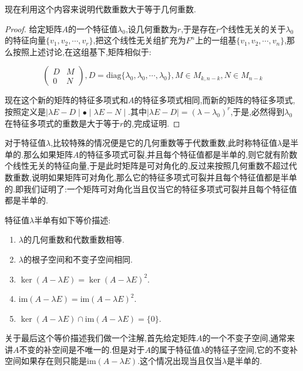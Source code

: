 现在利用这个内容来说明代数重数大于等于几何重数.
\begin{proof}

给定矩阵$A$的一个特征值$\lambda_0$,设几何重数为$r$,于是存在$r$个线性无关的关于$\lambda_0$的特征向量$\{v_1,v_2,\cdots,v_r\}$,把这个线性无关组扩充为$F^n$上的一组基$\{v_1,v_2,\cdots,v_n\}$,那么按照上述讨论,在这组基下,矩阵相似于:

$$\left(\begin{array}{cc}
D&M\\
0&N
\end{array}\right),D=\mathrm{diag}\{\lambda_0,\lambda_0,\cdots,\lambda_0\},M\in M_{k,n-k},N\in M_{n-k}$$

现在这个新的矩阵的特征多项式和$A$的特征多项式相同,而新的矩阵的特征多项式,按照定义是$\mid\lambda E-D\mid\bullet\mid\lambda E-N\mid$.其中$\mid\lambda E-D\mid=(\lambda-\lambda_0)^r$,于是,必然得到$\lambda_0$在特征多项式的重数是大于等于$r$的,完成证明.
\end{proof}

对于特征值$\lambda$,比较特殊的情况便是它的几何重数等于代数重数,此时称特征值$\lambda$是半单的.那么如果矩阵$A$的特征多项式可裂,并且每个特征值都是半单的,则它就有阶数个线性无关的特征向量,于是此时矩阵是可对角化的,反过来按照几何重数不超过代数重数,说明如果矩阵可对角化,那么它的特征多项式可裂并且每个特征值都是半单的.即我们证明了:一个矩阵可对角化当且仅当它的特征多项式可裂并且每个特征值都是半单的.

特征值$\lambda$半单有如下等价描述:
\begin{enumerate}
	\item $\lambda$的几何重数和代数重数相等.
	\item $\lambda$的根子空间和不变子空间相同.
	\item $\ker(A-\lambda E)=\ker(A-\lambda E)^2$.
	\item $\mathrm{im}(A-\lambda E)=\mathrm{im}(A-\lambda E)^2$.
	\item $\ker(A-\lambda E)\cap\mathrm{im}(A-\lambda E)=\{0\}$.
\end{enumerate}

关于最后这个等价描述我们做一个注解,首先给定矩阵$A$的一个不变子空间,通常来讲$A$不变的补空间是不唯一的.但是对于$A$的属于特征值$\lambda$的特征子空间,它的不变补空间如果存在则只能是$\mathrm{im}(A-\lambda E)$.这个情况出现当且仅当$\lambda$是半单的.

